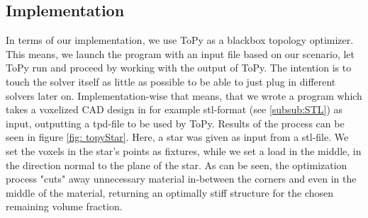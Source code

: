 \subsection{Implementation}
In terms of our implementation, we use ToPy as a blackbox topology optimizer. This means, we launch the program with an input file based on our scenario, let ToPy run and proceed by working with the output of ToPy. The intention is to touch the solver itself as little as possible to be able to just plug in different solvers later on. Implementation-wise that means, that we wrote a program which takes a voxelized CAD design in for example stl-format (see \autoref{subsub:STL}) as input, outputting a tpd-file to be used by ToPy. Results of the process can be seen in figure \ref{fig: topyStar}. Here, a star was given as input from a stl-file. We set the voxels in the star's points as fixtures, while we set a load in the middle, in the direction normal to the plane of the star. As can be seen, the optimization process "cuts" away unnecessary material in-between the corners and even in the middle of the material, returning an optimally stiff structure for the chosen remaining volume fraction. 
